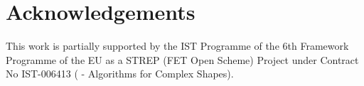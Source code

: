 
\section{Acknowledgements}

This work is partially supported by the IST Programme of the 6th
Framework Programme of the EU as a STREP (FET Open Scheme) Project
under Contract No IST-006413 ( -
Algorithms for Complex Shapes).

%



